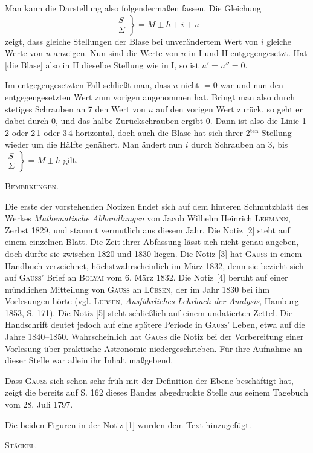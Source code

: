 Man kann die Darstellung also folgendermaßen fassen. Die Gleichung
\[
\left.\begin{array}{c} S \\ \Sigma \end{array}\right\} = M\pm h+i+u
\]
zeigt, dass gleiche Stellungen der Blase bei unverändertem Wert von $i$ gleiche Werte von $u$ anzeigen. Nun sind die Werte von $u$ in I und II entgegengesetzt. Hat [die Blase] also in II dieselbe Stellung wie in I, so ist $u'=u''=0$.

Im entgegengesetzten Fall schließt man, dass $u$ nicht $=0$ war und nun den entgegengesetzten Wert zum vorigen angenommen hat. Bringt man also durch stetiges Schrauben an 7 den Wert von $u$ auf den vorigen Wert zurück, so geht er dabei durch 0, und das halbe Zurückschrauben ergibt 0. Dann ist also die Linie 1\,2 oder 2\,1 oder 3\,4 horizontal, doch auch die Blase hat sich ihrer 2$^{\mathrm{ten}}$ Stellung wieder um die Hälfte genähert. Man ändert nun $i$ durch Schrauben an 3, bis $\left.\substack{S\\\Sigma}\right\} = M\pm h$ gilt.

\begin{center}
\textsc{Bemerkungen.}
\end{center}

Die erste der vorstehenden Notizen findet sich auf dem hinteren Schmutzblatt des Werkes \emph{Mathematische Abhandlungen} von Jacob Wilhelm Heinrich \textsc{Lehmann}, Zerbst 1829, und stammt vermutlich aus diesem Jahr. Die Notiz [2] steht auf einem einzelnen Blatt. Die Zeit ihrer Abfassung lässt sich nicht genau angeben, doch dürfte sie zwischen 1820 und 1830 liegen. Die Notiz [3] hat \textsc{Gauss} in einem Handbuch verzeichnet, höchstwahrscheinlich im März 1832, denn sie bezieht sich auf \textsc{Gauss}’ Brief an \textsc{Bolyai} vom 6. März 1832. Die Notiz [4] beruht auf einer mündlichen Mitteilung von \textsc{Gauss} an \textsc{Lübsen}, der im Jahr 1830 bei ihm Vorlesungen hörte (vgl. \textsc{Lübsen}, \emph{Ausf\"uhrliches Lehrbuch der Analysis}, Hamburg 1853, S. 171). Die Notiz [5] steht schließlich auf einem undatierten Zettel. Die Handschrift deutet jedoch auf eine spätere Periode in \textsc{Gauss}’ Leben, etwa auf die Jahre 1840--1850. Wahrscheinlich hat \textsc{Gauss} die Notiz bei der Vorbereitung einer Vorlesung über praktische Astronomie niedergeschrieben. Für ihre Aufnahme an dieser Stelle war allein ihr Inhalt maßgebend.

Dass \textsc{Gauss} sich schon sehr früh mit der Definition der Ebene beschäftigt hat, zeigt die bereits auf S. 162 dieses Bandes abgedruckte Stelle aus seinem Tagebuch vom 28. Juli 1797.

Die beiden Figuren in der Notiz [1] wurden dem Text hinzugefügt.

\hfill \textsc{Stäckel.}

